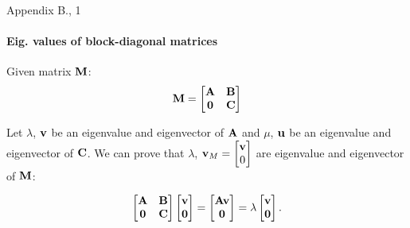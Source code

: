 \documentclass{beamer}
\begin{document}
\begin{frame}{Appendix B., 1}
		\framesubtitle{Eig. values of block-diagonal matrices}
	\begin{flushleft}
		
		Given matrix $\mathbf{M}$:
		\begin{align}
			\mathbf{M} = 
			\begin{bmatrix}
				\mathbf{A} & \mathbf{B} \\ \mathbf{0} & \mathbf{C}
			\end{bmatrix}
		\end{align}
		
		Let $\lambda$, $\mathbf{v}$ be an eigenvalue and eigenvector of $\mathbf{A}$ and $\mu$, $\mathbf{u}$ be an eigenvalue and eigenvector of $\mathbf{C}$. We can prove that $\lambda$, $\mathbf{v}_M = \begin{bmatrix}
			\mathbf{v} \\ 0
		\end{bmatrix}$ are eigenvalue and eigenvector of $\mathbf{M}$:
	
		\begin{align}
			\begin{bmatrix}
				\mathbf{A} & \mathbf{B} \\ \mathbf{0} & \mathbf{C}
			\end{bmatrix}
		\begin{bmatrix}
			\mathbf{v} \\ \mathbf{0}
		\end{bmatrix}
	=
	\begin{bmatrix}
		\mathbf{A}\mathbf{v} \\ \mathbf{0}
	\end{bmatrix}
	=
	\lambda
	\begin{bmatrix}
		\mathbf{v} \\ \mathbf{0}
	\end{bmatrix}.
		\end{align}
		
	\end{flushleft}
\end{frame}
\end{document}
